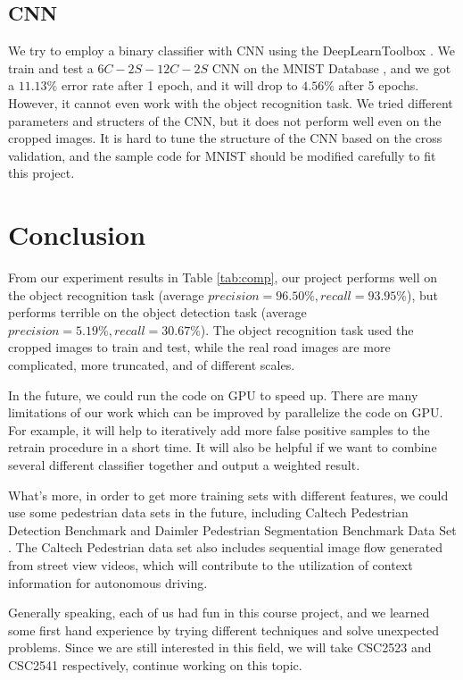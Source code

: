 \documentclass{article} %
\begin{document}
\subsection{CNN}

We try to employ a binary classifier with CNN using the DeepLearnToolbox \cite{palm2012prediction}. We train and test a $6C-2S-12C-2S$ CNN on the MNIST Database \cite{lecun1998gradient}, and we got a $11.13\%$ error rate after 1 epoch, and it will drop to $4.56\%$ after 5 epochs. However, it cannot even work with the object recognition task. We tried different parameters and structers of the CNN, but it does not perform well even on the cropped images. It is hard to tune the structure of the CNN based on the cross validation, and the sample code for MNIST should be modified carefully to fit this project.

\section{Conclusion}

From our experiment results in Table \ref{tab:comp}, our project performs well on the object recognition task (average $precision=96.50\%, recall=93.95\%$), but performs terrible on the object detection task (average $precision=5.19\%, recall=30.67\%$). The object recognition task used the cropped images to train and test, while the real road images are more complicated, more truncated, and of different scales.

In the future, we could run the code on GPU to speed up. There are many limitations of our work which can be improved by parallelize the code on GPU. For example, it will help to iteratively add more false positive samples to the retrain procedure in a short time. It will also be helpful if we want to combine several different classifier together and output a weighted result.

What's more, in order to get more training sets with different features, we could use some pedestrian data sets in the future, including Caltech Pedestrian Detection Benchmark \cite{Dollar2009} and Daimler Pedestrian Segmentation Benchmark Data Set \cite{flohr2013pedcut}. The Caltech Pedestrian data set also includes sequential image flow generated from street view videos, which will contribute to the utilization of context information for autonomous driving. 

Generally speaking, each of us had fun in this course project, and we learned some first hand experience by trying different techniques and solve unexpected problems. Since we are still interested in this field, we will take CSC2523 and CSC2541 respectively, continue working on this topic.
\end{document}
